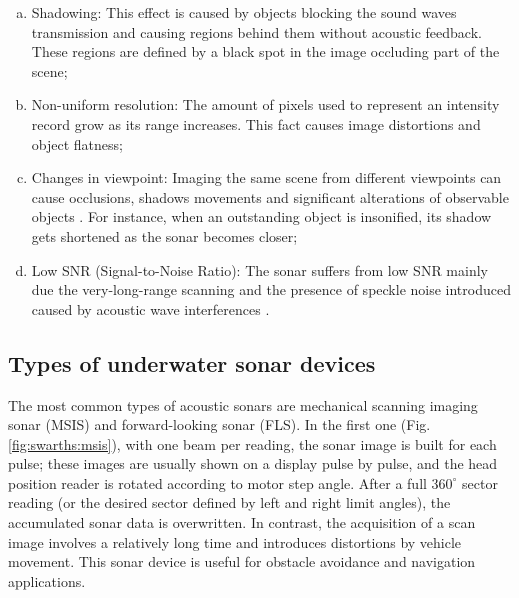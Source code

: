 \documentclass[final,5p,times]{elsarticle}
\begin{document}
\begin{enumerate}[(a)]
    \item Shadowing: This effect is caused by objects blocking the sound waves transmission and causing regions behind them without acoustic feedback. These regions are defined by a black spot in the image occluding part of the scene;
    \item Non-uniform resolution: The amount of pixels used to represent an intensity record grow as its range increases. This fact causes image distortions and object flatness;
    \item Changes in viewpoint: Imaging the same scene from different viewpoints can cause occlusions, shadows movements and significant alterations of observable objects \cite{hurtos2014}. For instance, when an outstanding object is insonified, its shadow gets shortened as the sonar becomes closer;
    \item Low SNR (Signal-to-Noise Ratio): The sonar suffers from low SNR mainly due the very-long-range scanning and the presence of speckle noise introduced caused by acoustic wave interferences \cite{abbott1973}.
\end{enumerate}


\subsection{Types of underwater sonar devices}
\label{sonar:devices}

The most common types of acoustic sonars are mechanical scanning imaging sonar (MSIS) and forward-looking sonar (FLS). In the first one (Fig. \ref{fig:swarths:msis}), with one beam per reading, the sonar image is built for each pulse; these images are usually shown on a display pulse by pulse, and the head position reader is rotated according to motor step angle. After a full $360^{\circ}$ sector reading (or the desired sector defined by left and right limit angles), the accumulated sonar data is overwritten. In contrast, the acquisition of a scan image involves a relatively long time and introduces distortions by vehicle movement. This sonar device is useful for obstacle avoidance \cite{ganesan2015} and navigation \cite{ribas2010} applications.
\end{document}
